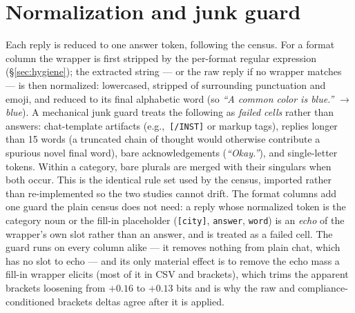 \documentclass[11pt]{article}
\newcommand{\eg}{e.g.,\ }
\begin{document}
\section{Normalization and junk guard}
\label{sec:norm}
Each reply is reduced to one answer token, following the census. For a format column the wrapper
is first stripped by the per-format regular expression (\S\ref{sec:hygiene}); the extracted
string --- or the raw reply if no wrapper matches --- is then normalized: lowercased, stripped of
surrounding punctuation and emoji, and reduced to its final alphabetic word (so \emph{``A common
color is blue.''} $\to$ \emph{blue}). A mechanical junk guard treats the following as \emph{failed
cells} rather than answers: chat-template artifacts (\eg \texttt{[/INST]} or markup tags), replies
longer than 15 words (a truncated chain of thought would otherwise contribute a spurious novel
final word), bare acknowledgements (\emph{``Okay.''}), and single-letter tokens. Within a
category, bare plurals are merged with their singulars when both occur. This is the identical rule
set used by the census, imported rather than re-implemented so the two studies cannot drift. The
format columns add one guard the plain census does not need: a reply whose normalized token is
the category noun or the fill-in placeholder (\texttt{[city]}, \texttt{answer}, \texttt{word}) is
an \emph{echo} of the wrapper's own slot rather than an answer, and is treated as a failed cell.
The guard runs on every column alike --- it removes nothing from plain chat, which has no slot to
echo --- and its only material effect is to remove the echo mass a fill-in wrapper elicits (most
of it in CSV and brackets), which trims the apparent brackets loosening from $+0.16$ to $+0.13$
bits and is why the raw and compliance-conditioned brackets deltas agree after it is applied.
\end{document}
